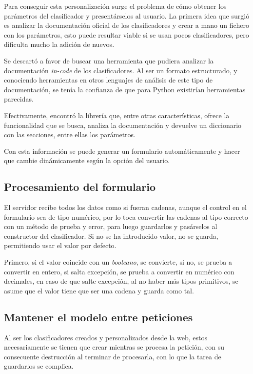 Para conseguir esta personalización surge el problema de cómo obtener los
parámetros del clasificador y presentárselos al usuario. La primera idea que
surgió es analizar la documentación oficial de los clasificadores y crear a mano
un fichero con los parámetros, esto puede resultar viable si se usan pocos
clasificadores, pero dificulta mucho la adición de nuevos.

Se descartó a favor de buscar una herramienta que pudiera analizar la
documentación \textit{in-code} de los clasificadores. Al ser un formato
estructurado, y conociendo herramientas en otros lenguajes de análisis de este
tipo de documentación, se tenía la confianza de que para Python existirían
herramientas parecidas.

Efectivamente, encontró la librería 
que, entre otras características, ofrece la funcionalidad que se busca, analiza
la documentación y devuelve un diccionario con las secciones, entre ellas los
parámetros.

Con esta información se puede generar un formulario automáticamente y hacer que
cambie dinámicamente según la opción del usuario.

\subsection{Procesamiento del formulario}

El servidor recibe todos los datos como si fueran cadenas, aunque el control en
el formulario sea de tipo numérico, por lo toca convertir las cadenas al tipo
correcto con un método de prueba y error, para luego guardarlos y pasárselos al
constructor del clasificador. Si no se ha introducido valor, no se guarda,
permitiendo usar el valor por defecto.

Primero, si el valor coincide con un \textit{booleano}, se convierte, si no, se
prueba a convertir en entero, si salta excepción, se prueba a convertir en
numérico con decimales, en caso de que salte excepción, al no haber más tipos
primitivos, se asume que el valor tiene que ser una cadena y guarda como tal.

\subsection{Mantener el modelo entre peticiones}

Al ser los clasificadores creados y personalizados desde la web, estos
necesariamente se tienen que crear mientras se procesa la petición, con su
consecuente destrucción al terminar de procesarla, con lo que la tarea de
guardarlos se complica.

